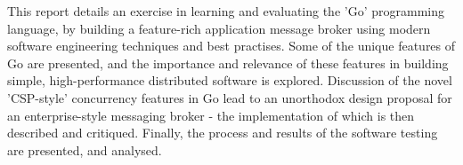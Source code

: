 This report details an exercise in learning and evaluating the 'Go' programming
language, by building a feature-rich application message broker using modern
software engineering techniques and best practises. Some of the unique features
of Go are presented, and the importance and relevance of these features in
building simple, high-performance distributed software is explored. Discussion
of the novel 'CSP-style' concurrency features in Go lead to an unorthodox design
proposal for an enterprise-style messaging broker - the implementation of which
is then described and critiqued. Finally, the process and results of the software
testing are presented, and analysed.
